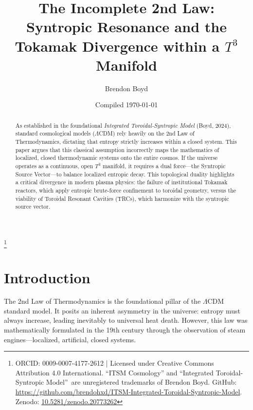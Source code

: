 \documentclass[aps,prd,11pt,onecolumn,superscriptaddress,nofootinbib,floatfix]{revtex4-2}
\begin{document}
\title{The Incomplete 2nd Law: \\ Syntropic Resonance and the Tokamak Divergence within a $T^3$ Manifold}
\author{Brendon Boyd}
\thanks{ORCID: 0009-0007-4177-2612 | Licensed under Creative Commons Attribution 4.0 International. ``ITSM Cosmology'' and ``Integrated Toroidal-Syntropic Model''\texttrademark\ are unregistered trademarks of Brendon Boyd. GitHub: \url{https://github.com/brendohxd/ITSM-Integrated-Toroidal-Syntropic-Model}. Zenodo: \href{https://doi.org/10.5281/zenodo.20773262}{10.5281/zenodo.20773262}}
\date{Compiled \today}

\begin{abstract}
As established in the foundational \textit{Integrated Toroidal-Syntropic Model} (Boyd, 2024), standard cosmological models ($\Lambda$CDM) rely heavily on the 2nd Law of Thermodynamics, dictating that entropy strictly increases within a closed system. This paper argues that this classical assumption incorrectly maps the mathematics of localized, closed thermodynamic systems onto the entire cosmos. If the universe operates as a continuous, open $T^3$ manifold, it requires a dual force—the Syntropic Source Vector—to balance localized entropic decay. This topological duality highlights a critical divergence in modern plasma physics: the failure of institutional Tokamak reactors, which apply entropic brute-force confinement to toroidal geometry, versus the viability of Toroidal Resonant Cavities (TRCs), which harmonize with the syntropic source vector.
\end{abstract}

\maketitle

\section{Introduction}
\label{sec:intro}

The 2nd Law of Thermodynamics is the foundational pillar of the $\Lambda$CDM standard model. It posits an inherent asymmetry in the universe: entropy must always increase, leading inevitably to universal heat death. However, this law was mathematically formulated in the 19th century through the observation of steam engines—localized, artificial, closed systems. 
\end{document}
